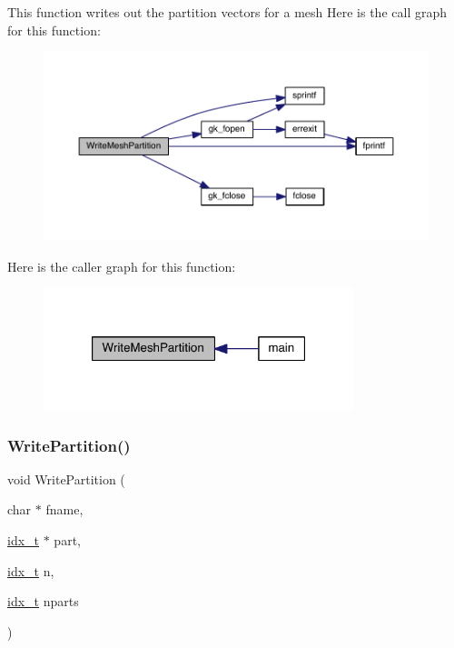 This function writes out the partition vectors for a mesh Here is the call graph for this function\+:\nopagebreak
\begin{figure}[H]
\begin{center}
\leavevmode
\includegraphics[width=350pt]{a00948_ac8ce682e47fbcfad378ee4100ab091ca_cgraph}
\end{center}
\end{figure}
Here is the caller graph for this function\+:\nopagebreak
\begin{figure}[H]
\begin{center}
\leavevmode
\includegraphics[width=256pt]{a00948_ac8ce682e47fbcfad378ee4100ab091ca_icgraph}
\end{center}
\end{figure}
\mbox{\label{a00948_ad05062397a736c5602a72c2419deffbf}} 
\subsubsection{\texorpdfstring{Write\+Partition()}{WritePartition()}}
{\footnotesize\ttfamily void Write\+Partition (\begin{DoxyParamCaption}\item[{char $\ast$}]{fname,  }\item[{\hyperlink{a00876_aaa5262be3e700770163401acb0150f52}{idx\+\_\+t} $\ast$}]{part,  }\item[{\hyperlink{a00876_aaa5262be3e700770163401acb0150f52}{idx\+\_\+t}}]{n,  }\item[{\hyperlink{a00876_aaa5262be3e700770163401acb0150f52}{idx\+\_\+t}}]{nparts }\end{DoxyParamCaption})}

